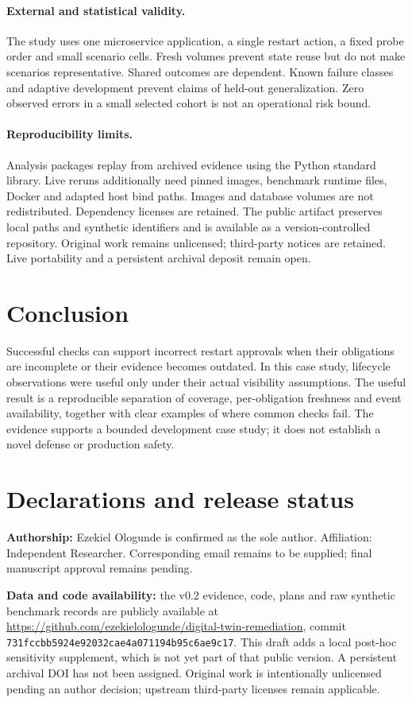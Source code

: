 \documentclass[manuscript,review,nonacm]{acmart}
\begin{document}
\paragraph{External and statistical validity.} The study uses one microservice application, a single restart action, a fixed probe order and small scenario cells. Fresh volumes prevent state reuse but do not make scenarios representative. Shared outcomes are dependent. Known failure classes and adaptive development prevent claims of held-out generalization. Zero observed errors in a small selected cohort is not an operational risk bound.

\paragraph{Reproducibility limits.} Analysis packages replay from archived evidence using the Python standard library. Live reruns additionally need pinned images, benchmark runtime files, Docker and adapted host bind paths. Images and database volumes are not redistributed. Dependency licenses are retained. The public artifact preserves local paths and synthetic identifiers and is available as a version-controlled repository. Original work remains unlicensed; third-party notices are retained. Live portability and a persistent archival deposit remain open.

\section{Conclusion}
Successful checks can support incorrect restart approvals when their obligations are incomplete or their evidence becomes outdated. In this case study, lifecycle observations were useful only under their actual visibility assumptions. The useful result is a reproducible separation of coverage, per-obligation freshness and event availability, together with clear examples of where common checks fail. The evidence supports a bounded development case study; it does not establish a novel defense or production safety.

\section*{Declarations and release status}
\textbf{Authorship:} Ezekiel Ologunde is confirmed as the sole author. Affiliation: Independent Researcher. Corresponding email remains to be supplied; final manuscript approval remains pending.

\textbf{Data and code availability:} the v0.2 evidence, code, plans and raw synthetic benchmark records are publicly available at \url{https://github.com/ezekielologunde/digital-twin-remediation}, commit \texttt{731fccbb5924e92032cae4a071194b95c6ae9c17}. This draft adds a local post-hoc sensitivity supplement, which is not yet part of that public version. A persistent archival DOI has not been assigned. Original work is intentionally unlicensed pending an author decision; upstream third-party licenses remain applicable.
\end{document}
